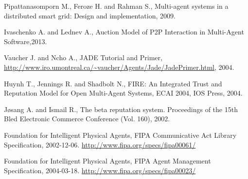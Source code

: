\documentclass{llncs}
\begin{document}
\begin{thebibliography}{1}

Pipattanasomporn M., Feroze H. and Rahman S., Multi-agent systems in a distributed smart grid: Design and implementation, 2009.

Ivaschenko A. and Lednev A., Auction Model of P2P Interaction in Multi-Agent Software,2013.
 
Vaucher J. and Ncho A., JADE Tutorial and Primer, \url{http://www.iro.umontreal.ca/~vaucher/Agents/Jade/JadePrimer.html}, 2004.

Huynh T., Jennings R. and Shadbolt N., FIRE: An Integrated Trust and Reputation Model for Open Multi-Agent Systems, ECAI 2004, IOS Press, 2004.

Jøsang A. and Ismail R., The beta reputation system. Proceedings of the 15th Bled Electronic Commerce Conference (Vol. 160), 2002.

Foundation for Intelligent Physical Agents, FIPA Communicative Act Library Specification, 2002-12-06. \url{http://www.fipa.org/specs/fipa00061/}

Foundation for Intelligent Physical Agents, FIPA Agent Management Specification,  	
2004-03-18. \url{http://www.fipa.org/specs/fipa00023/}

\end{thebibliography}
\end{document}

